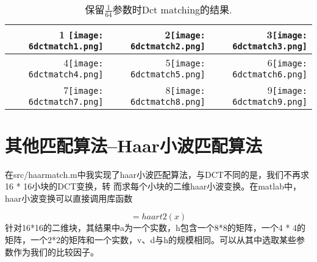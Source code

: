 \documentclass{ctexart}
\begin{document}
\begin{table}
\Large 
\begin{tabular}{|r|r|r|}
\hline

1 \texttt{[image: 6dctmatch1.png]} & 2\texttt{[image: 6dctmatch2.png]} & 3\texttt{[image: 6dctmatch3.png]} \\ \hline

4\texttt{[image: 6dctmatch4.png]} & 5\texttt{[image: 6dctmatch5.png]} & 6\texttt{[image: 6dctmatch6.png]} \\ \hline

7\texttt{[image: 6dctmatch7.png]} & 8\texttt{[image: 6dctmatch8.png]} & 9\texttt{[image: 6dctmatch9.png]} \\ \hline

\end{tabular}
\caption{保留$\frac{1}{64}$参数时Dct matching的结果.}
\end{table}

\clearpage
\section{其他匹配算法--Haar小波匹配算法}
在src/haarmatch.m中我实现了haar小波匹配算法，与DCT不同的是，我们不再求16 * 16小块的DCT变换，转
而求每个小块的二维haar小波变换。在matlab中，haar小波变换可以直接调用库函数

\begin{equation}
[a,h,v,d] = haart2(x)
\end{equation}
针对16*16的二维块，其结果中a为一个实数，h包含一个8*8的矩阵，一个4 * 4的矩阵，一个2*2的矩阵和一个实数，v、d与h的规模相同。可以从其中选取某些参数作为我们的比较因子。
\end{document}
